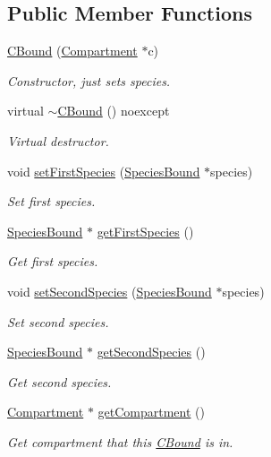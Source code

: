 \subsection*{Public Member Functions}
\begin{DoxyCompactItemize}
\item 
\hyperlink{classCBound_a6fd75889661a816ef641a3963d83c2b8}{C\+Bound} (\hyperlink{classCompartment}{Compartment} $\ast$c)
\begin{DoxyCompactList}\small\item\em Constructor, just sets species. \end{DoxyCompactList}\item 
virtual \hyperlink{classCBound_adbee50be51a5fec03fe60a9ee7c5879f}{$\sim$\+C\+Bound} () noexcept
\begin{DoxyCompactList}\small\item\em Virtual destructor. \end{DoxyCompactList}\item 
void \hyperlink{classCBound_a17d4b84d683b0b7bd75b793410fed18f}{set\+First\+Species} (\hyperlink{classSpeciesBound}{Species\+Bound} $\ast$species)
\begin{DoxyCompactList}\small\item\em Set first species. \end{DoxyCompactList}\item 
\hyperlink{classSpeciesBound}{Species\+Bound} $\ast$ \hyperlink{classCBound_aad60656a671e4ffdc45b4c904fa7c320}{get\+First\+Species} ()
\begin{DoxyCompactList}\small\item\em Get first species. \end{DoxyCompactList}\item 
void \hyperlink{classCBound_a01badbb54867fb99b6f3a895d555867a}{set\+Second\+Species} (\hyperlink{classSpeciesBound}{Species\+Bound} $\ast$species)
\begin{DoxyCompactList}\small\item\em Set second species. \end{DoxyCompactList}\item 
\hyperlink{classSpeciesBound}{Species\+Bound} $\ast$ \hyperlink{classCBound_a1e706b6472c40ae1d98a64eda0acdadf}{get\+Second\+Species} ()
\begin{DoxyCompactList}\small\item\em Get second species. \end{DoxyCompactList}\item 
\hyperlink{classCompartment}{Compartment} $\ast$ \hyperlink{classCBound_a6c4d7b1b35d06725c8659424bf0c3f18}{get\+Compartment} ()
\begin{DoxyCompactList}\small\item\em Get compartment that this \hyperlink{classCBound}{C\+Bound} is in. \end{DoxyCompactList}\end{DoxyCompactItemize}
